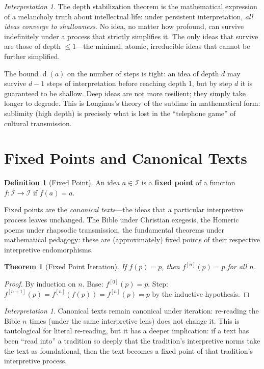 \documentclass[11pt,openany]{book}
\theoremstyle{definition}
\newtheorem{definition}[axiom]{Definition}
\theoremstyle{plain}
\newtheorem{theorem}[axiom]{Theorem}
\theoremstyle{remark}
\newtheorem{interpretation}[axiom]{Interpretation}
\newcommand{\IS}{\mathcal{I}}               %
\newcommand{\depth}{\operatorname{d}}       %
\begin{document}
\begin{interpretation}
The depth stabilization theorem is the mathematical expression of a melancholy truth about intellectual life: under persistent interpretation, \emph{all ideas converge to shallowness}. No idea, no matter how profound, can survive indefinitely under a process that strictly simplifies it. The only ideas that survive are those of depth $\leq 1$---the minimal, atomic, irreducible ideas that cannot be further simplified.

The bound $\depth(a)$ on the number of steps is tight: an idea of depth $d$ may survive $d - 1$ steps of interpretation before reaching depth 1, but by step $d$ it is guaranteed to be shallow. Deep ideas are not more resilient; they simply take longer to degrade. This is Longinus's theory of the sublime in mathematical form: sublimity (high depth) is precisely what is lost in the ``telephone game'' of cultural transmission.
\end{interpretation}

\section{Fixed Points and Canonical Texts}

\begin{definition}[Fixed Point]
An idea $a \in \IS$ is a \textbf{fixed point} of a function $f : \IS \to \IS$ if $f(a) = a$.
\end{definition}

Fixed points are the \emph{canonical texts}---the ideas that a particular interpretive process leaves unchanged. The Bible under Christian exegesis, the Homeric poems under rhapsodic transmission, the fundamental theorems under mathematical pedagogy: these are (approximately) fixed points of their respective interpretive endomorphisms.

\begin{theorem}[Fixed Point Iteration]
\label{thm:fixed-point-iterate}
If $f(p) = p$, then $f^{[n]}(p) = p$ for all $n$.
\end{theorem}

\begin{proof}
By induction on $n$. Base: $f^{[0]}(p) = p$. Step: $f^{[n+1]}(p) = f^{[n]}(f(p)) = f^{[n]}(p) = p$ by the inductive hypothesis.
\end{proof}

\begin{interpretation}
Canonical texts remain canonical under iteration: re-reading the Bible $n$ times (under the same interpretive lens) does not change it. This is tautological for literal re-reading, but it has a deeper implication: if a text has been ``read into'' a tradition so deeply that the tradition's interpretive norms take the text as foundational, then the text becomes a fixed point of that tradition's interpretive process.
\end{interpretation}
\end{document}
